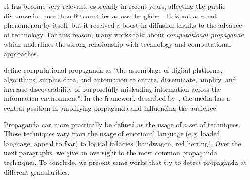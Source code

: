 It has become very relevant, especially in recent years, affecting the public discourse in more than 80 countries across the globe~\citep{bradshaw2021industrialized}.
It is not a recent phenomenon by itself, but it received a boost in diffusion thanks to the advance of technology.
For this reason, many works talk about \emph{computational propaganda} which underlines the strong relationship with technology and computational approaches.

\cite{hassan2023} define computational propaganda as ``the assemblage of digital platforms, algorithms, surplus data, and automation to curate, disseminate, amplify,
and increase discoverability of purposefully misleading information across the information
environment".
In the framework described by~\citet{hassan2023}, the media has a central position in amplifying propaganda and influencing the audience.

Propaganda can more practically be defined as the usage of a set of techniques. These techniques vary from the usage of emotional language (e.g. loaded language, appeal to fear) to logical fallacies (bandwagon, red herring).
%
Over the next paragraphs, %
we give an oversight to the most common propaganda techniques.
To conclude, we present some works that try to detect propaganda at different granularities.



